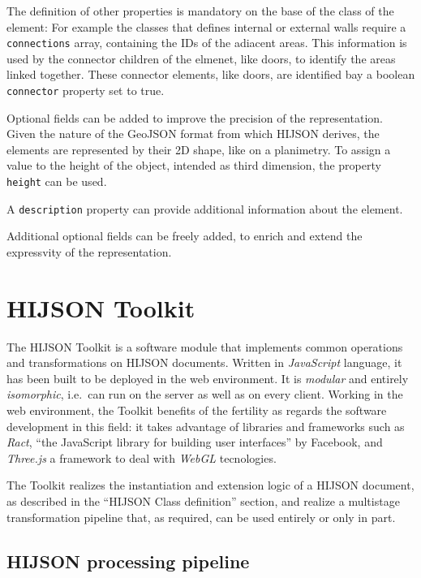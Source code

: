 \documentclass{sig-alternate}
\begin{document}
The definition of other properties is mandatory on the base of the class
of the element: For example the classes that defines internal or
external walls require a \texttt{connections} array, containing the IDs
of the adiacent areas. This information is used by the connector
children of the elmenet, like doors, to identify the areas linked
together. These connector elements, like doors, are identified bay a
boolean \texttt{connector} property set to true.

Optional fields can be added to improve the precision of the
representation. Given the nature of the GeoJSON format from which HIJSON
derives, the elements are represented by their 2D shape, like on a
planimetry. To assign a value to the height of the object, intended as
third dimension, the property \texttt{height} can be used.

A \texttt{description} property can provide additional information about
the element.

Additional optional fields can be freely added, to enrich and extend the
expressvity of the representation.

\section{HIJSON Toolkit}\label{hijson-toolkit}

The HIJSON Toolkit is a software module that implements common
operations and transformations on HIJSON documents. Written in
\emph{JavaScript} language, it has been built to be deployed in the web
environment. It is \emph{modular} and entirely \emph{isomorphic},
i.e.~can run on the server as well as on every client. Working in the
web environment, the Toolkit benefits of the fertility as regards the
software development in this field: it takes advantage of libraries and
frameworks such as \emph{Ract}, ``the JavaScript library for building
user interfaces'' by Facebook, and \emph{Three.js} a framework to deal
with \emph{WebGL} tecnologies.

The Toolkit realizes the instantiation and extension logic of a HIJSON
document, as described in the ``HIJSON Class definition'' section, and
realize a multistage transformation pipeline that, as required, can be
used entirely or only in part.

\subsection{HIJSON processing pipeline}\label{hijson-processing-pipeline}
\end{document}
